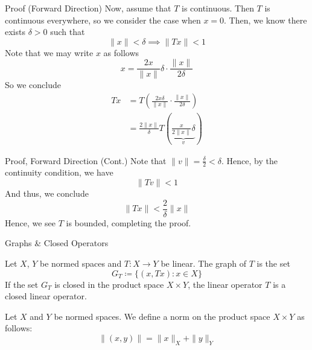 \documentclass[10pt]{beamer}
\begin{document}
		\begin{frame}{Proof (Forward Direction)}
				Now, assume that $T$ is continuous. Then $T$ is continuous everywhere, so we consider the case when $x = 0$. Then, we know there exists $\delta > 0$ such that 
				\begin{equation*}
						\|x\| < \delta \implies \|Tx\| < 1
				\end{equation*}
				Note that we may write $x$ as follows 
				\begin{equation*}
						x = \frac{2x}{\|x\|}\delta \cdot \frac{\|x\|}{2 \delta}
				\end{equation*}
				So we conclude 
				\begin{align*}
						Tx &= T \left( \frac{2x \delta}{\|x\|} \cdot \frac{\|x\|}{2\delta} \right) \\ 
							 &=  \frac{2\|x\|}{\delta}T \left( \underbrace{\frac{x}{2\|x\|} \delta}_{v} \right)
				\end{align*}
		\end{frame}

		\begin{frame}{Proof, Forward Direction (Cont.)}
				Note that $\|v\| = \frac{\delta}{2} < \delta$. Hence, by the continuity condition, we have 
				\begin{equation*}
						\|Tv\| < 1
				\end{equation*}
				And thus, we conclude 
				\begin{equation*}
						\|Tx\| < \frac{2}{\delta}\|x\|
				\end{equation*}
				Hence, we see $T$ is bounded, completing the proof.
		\end{frame}

		\begin{frame}{Graphs \& Closed Operators}
				\begin{definition}
						Let $X$, $Y$ be normed spaces and $T: X\to Y$ be linear. The \alert{graph} of $T$ is the set 
						\begin{equation*}
								G_T \coloneqq \{(x, Tx) : x\in X\}
						\end{equation*}
						If the set $G_T$ is closed in the product space $X\times Y$, the linear operator $T$ is a \alert{closed linear operator}.
				\end{definition}
				Let $X$ and $Y$ be normed spaces. We define a norm on the \alert{product space} $X\times Y$ as follows: 
				\begin{equation*}
						\|(x,y)\| = \|x\|_X + \|y\|_Y
				\end{equation*}
		\end{frame}
\end{document}
